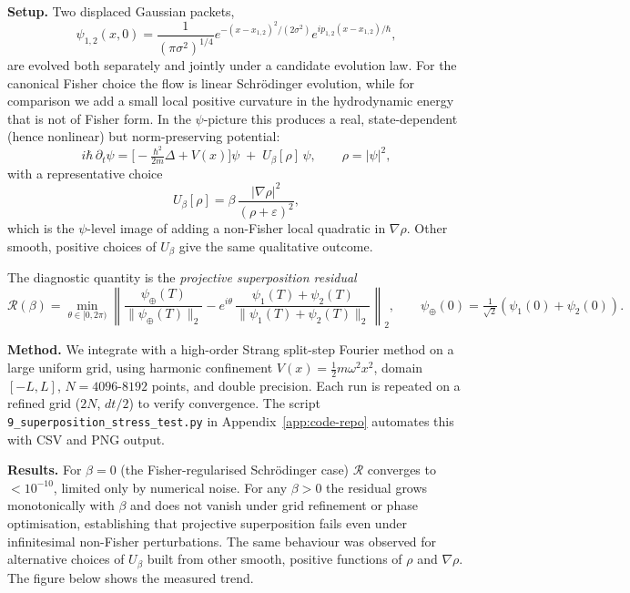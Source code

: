 \documentclass[11pt,a4paper]{article}
\numberwithin{equation}{section}
\theoremstyle{thmcompact}
\theoremstyle{remark}
\begin{document}
\smallskip
\textbf{Setup.}
Two displaced Gaussian packets,
\[
\psi_{1,2}(x,0)
=\frac{1}{(\pi\sigma^2)^{1/4}}
e^{-(x-x_{1,2})^2/(2\sigma^2)}e^{ip_{1,2}(x-x_{1,2})/\hbar},
\]
are evolved both separately and jointly under a candidate evolution law.
For the canonical Fisher choice the flow is linear Schrödinger evolution,
while for comparison we add a small local positive curvature in the hydrodynamic energy that is not of Fisher form. In the $\psi$-picture this produces a real, state-dependent (hence nonlinear) but norm-preserving potential:
\[
i\hbar\,\partial_t\psi
=\Big[-\tfrac{\hbar^2}{2m}\Delta+V(x)\Big]\psi\;+\;U_{\beta}[\rho]\,\psi,
\qquad \rho=|\psi|^2,
\]
with a representative choice
\[
U_{\beta}[\rho]=\beta\,\frac{|\nabla\rho|^2}{(\rho+\varepsilon)^2},
\]
which is the $\psi$-level image of adding a non-Fisher local quadratic in $\nabla\rho$. Other smooth, positive choices of $U_{\beta}$ give the same qualitative outcome.

The diagnostic quantity is the
\emph{projective superposition residual}
\[
\mathcal{R}(\beta)
=\min_{\theta\in[0,2\pi)}\left\|
\frac{\psi_\oplus(T)}{\|\psi_\oplus(T)\|_2}
- e^{i\theta}\,
\frac{\psi_1(T)+\psi_2(T)}{\|\psi_1(T)+\psi_2(T)\|_2}
\right\|_{2},
\qquad
\psi_\oplus(0)=\tfrac{1}{\sqrt2}(\psi_1(0)+\psi_2(0)).
\]


\smallskip
\textbf{Method.}
We integrate with a high-order Strang split-step Fourier method on a large
uniform grid, using harmonic confinement $V(x)=\tfrac12m\omega^2x^2$,
domain $[-L,L]$, $N=4096$-$8192$ points, and double precision.
Each run is repeated on a refined grid ($2N$, $dt/2$)
to verify convergence.
The script \texttt{9\_superposition\_stress\_test.py}
in Appendix~\ref{app:code-repo}
automates this with CSV and PNG output.

\smallskip
\textbf{Results.}
For $\beta=0$ (the Fisher-regularised Schrödinger case)
$\mathcal{R}$ converges to $<10^{-10}$,
limited only by numerical noise.
For any $\beta>0$ the residual grows monotonically with $\beta$ and does not vanish under grid refinement or phase optimisation, establishing that projective superposition fails even under infinitesimal non-Fisher perturbations. The same behaviour was observed for alternative choices of $U_{\beta}$ built from other smooth, positive functions of $\rho$ and $\nabla\rho$.
The figure below shows the measured trend.
\end{document}
